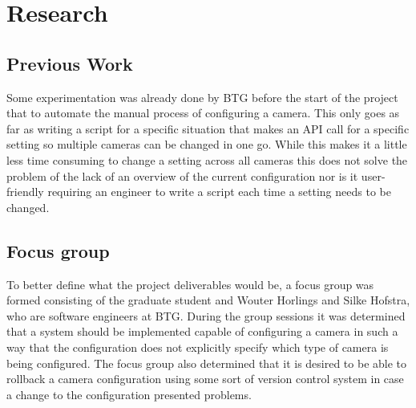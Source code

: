 \chapter{Research}

\section{Previous Work}
Some experimentation was already done by BTG before the start of the project that to automate the manual process of configuring a camera.
This only goes as far as writing a script for a specific situation that makes an API call for a specific setting so multiple cameras can be changed in one go.
While this makes it a little less time consuming to change a setting across all cameras this does not solve the problem of the lack of an overview of the current configuration nor is it user-friendly requiring an engineer to write a script each time a setting needs to be changed.

\section{Focus group}
To better define what the project deliverables would be, a focus group was formed consisting of the graduate student and  Wouter Horlings and Silke Hofstra, who are software engineers at BTG.
During the group sessions it was determined that a system should be implemented capable of configuring a camera in such a way that the configuration does not explicitly specify which type of camera is being configured.
The focus group also determined that it is desired to be able to rollback a camera configuration using some sort of version control system in case a change to the configuration presented problems.




